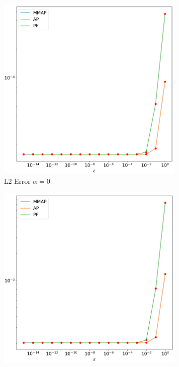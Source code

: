 \documentclass[12pt]{ociamthesis}
\begin{document}
\begin{figure}[H]
 \begin{subfigure}{0.42\textwidth}
     \includegraphics[width=\textwidth]{Pics/LHSims/E1a_MMAP_AP_PFL2.png}
     \caption{L2 Error $\alpha=0$}
 \end{subfigure}
   \begin{subfigure}{0.42\textwidth}
     \includegraphics[width=\textwidth]{Pics/LHSims/E1a_MMAP_AP_PFH1.png}

\end{subfigure}
\end{figure}
\end{document}
